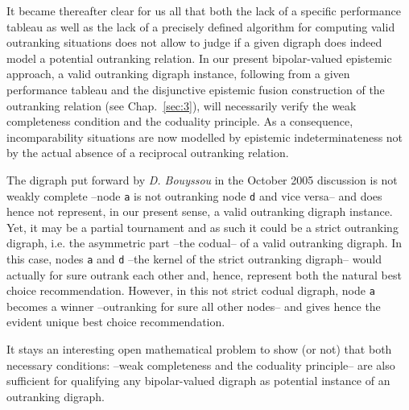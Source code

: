 It became thereafter clear for us all that both the lack of a specific performance tableau as well as the lack of a precisely defined algorithm for computing valid outranking situations does not allow to judge if a given digraph does indeed model a potential outranking relation. In our present bipolar-valued epistemic approach, a valid outranking digraph instance, following from a given performance tableau and the disjunctive epistemic fusion construction of the outranking relation (see Chap.~\ref{sec:3}), will necessarily verify the weak completeness condition and the coduality principle. As a consequence, incomparability situations are now modelled by epistemic indeterminateness not by the actual absence of a reciprocal outranking relation.

The digraph put forward by \emph{D. Bouyssou} in the October 2005 discussion is not weakly complete --node \texttt{a} is not outranking node \texttt{d} and vice versa-- and does hence not represent, in our present sense, a valid outranking digraph instance. Yet, it may be a partial tournament and as such it could be a strict outranking digraph, i.e. the asymmetric part --the codual-- of a valid outranking digraph. In this case, nodes \texttt{a} and \texttt{d} --the kernel of the strict outranking digraph-- would actually for sure outrank each other and, hence, represent both the natural best choice recommendation. However, in this not strict codual digraph, node \texttt{a} becomes a \Condorcet winner --outranking for sure all other nodes-- and gives hence the evident unique best choice recommendation.

It stays an interesting open mathematical problem to show (or not) that both necessary conditions: --weak completeness and the coduality principle-- are also sufficient for qualifying any bipolar-valued digraph as potential instance of an outranking digraph.


%


